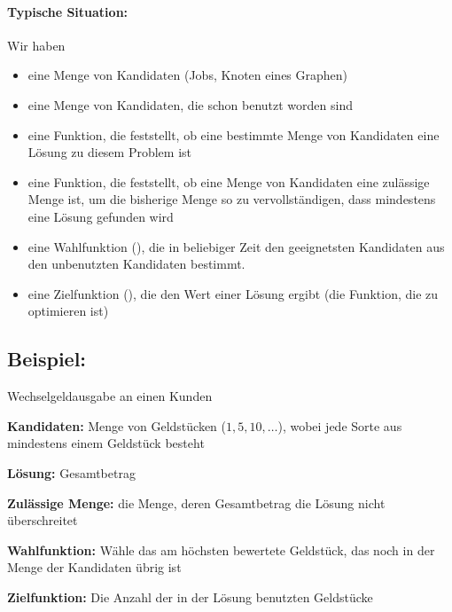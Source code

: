\documentclass[a4paper,twoside,DIV15,BCOR12mm]{scrbook}
\begin{document}
\paragraph{Typische Situation:} Wir haben
\begin{itemize}
	\item eine Menge von Kandidaten (Jobs, Knoten eines Graphen)
	\item eine Menge von Kandidaten, die schon benutzt worden sind
	\item eine Funktion, die feststellt, ob eine bestimmte Menge von Kandidaten eine Lösung zu diesem Problem ist
	\item eine Funktion, die feststellt, ob eine Menge von Kandidaten eine zulässige Menge ist, um die bisherige Menge so zu vervollständigen,
	      dass mindestens eine Lösung gefunden wird
	\item eine Wahlfunktion (), die in beliebiger Zeit den geeignetsten Kandidaten aus den unbenutzten Kandidaten bestimmt.
	\item eine Zielfunktion (), die den Wert einer Lösung ergibt (die Funktion, die zu optimieren ist)
\end{itemize}

\subsection{Beispiel:} Wechselgeldausgabe an einen Kunden
\begin{description}
	\item{\textbf{Kandidaten:}} Menge von Geldstücken ($1, 5, 10, \dots$), wobei jede Sorte aus mindestens einem Geldstück besteht
	\item{\textbf{Lösung:}} Gesamtbetrag
	\item{\textbf{Zulässige Menge:}} die Menge, deren Gesamtbetrag die Lösung nicht überschreitet
	\item{\textbf{Wahlfunktion:}} Wähle das am höchsten bewertete Geldstück, das noch in der Menge der Kandidaten übrig ist
	\item{\textbf{Zielfunktion:}} Die Anzahl der in der Lösung benutzten Geldstücke
\end{description}
\end{document}
